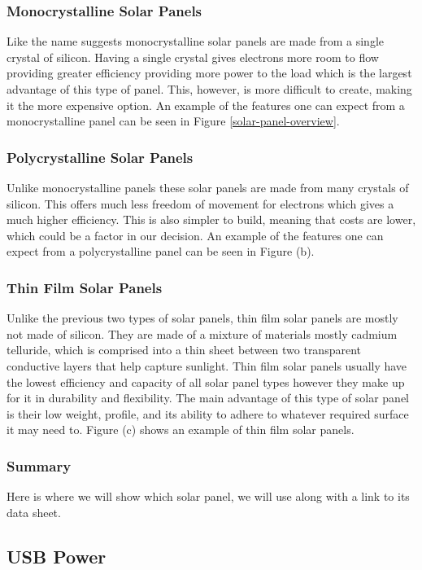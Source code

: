 \subsubsection{Monocrystalline Solar Panels}

Like the name suggests monocrystalline solar panels are made from a single crystal of silicon. Having a single crystal gives electrons more room to flow providing greater efficiency providing more power to the load which is the largest advantage of this type of panel. This, however, is more difficult to create, making it the more expensive option. An example of the features one can expect from a monocrystalline panel can be seen in Figure \ref{solar-panel-overview}. 

\subsubsection{Polycrystalline Solar Panels}

Unlike monocrystalline panels these solar panels are made from many crystals of silicon. This offers much less freedom of movement for electrons which gives a much higher efficiency. This is also simpler to build, meaning that costs are lower, which could be a factor in our decision. An example of the features one can expect from a polycrystalline panel can be seen in Figure (b). 

\subsubsection{Thin Film Solar Panels}

Unlike the previous two types of solar panels, thin film solar panels are mostly not made of silicon. They are made of a mixture of materials mostly cadmium telluride, which is comprised into a thin sheet between two transparent conductive layers that help capture sunlight. Thin film solar panels usually have the lowest efficiency and capacity of all solar panel types however they make up for it in durability and flexibility. The main advantage of this type of solar panel is their low weight, profile, and its ability to adhere to whatever required surface it may need to. Figure (c) shows an example of thin film solar panels. 

\subsubsection{Summary}

Here is where we will show which solar panel, we will use along with a link to its data sheet. 


\subsection{USB Power}

